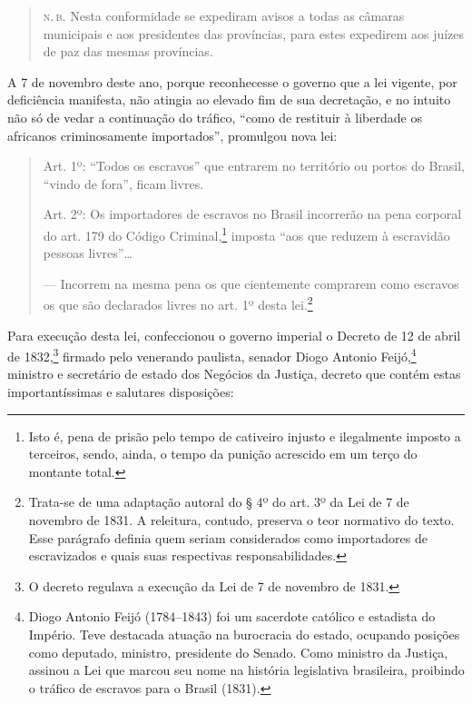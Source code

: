 \begin{quote}
\textsc{n.\,b.} Nesta conformidade se expediram avisos a todas as câmaras
municipais e aos presidentes das províncias, para estes expedirem aos
juízes de paz das mesmas províncias.
\end{quote}

A 7 de novembro deste ano, porque reconhecesse o governo que a lei
vigente, por deficiência manifesta, não atingia ao elevado fim de sua
decretação, e no intuito não só de vedar a continuação do tráfico, ``como
de restituir à liberdade os africanos criminosamente importados'',
promulgou nova lei:

\begin{quote}
Art. 1º: ``Todos os escravos'' que entrarem no território ou portos do
Brasil, ``vindo de fora'', ficam livres.

Art. 2º: Os importadores de escravos no Brasil incorrerão na pena
corporal do art. 179 do Código Criminal,\footnote{Isto é, pena de
  prisão pelo tempo de cativeiro injusto e ilegalmente imposto a
  terceiros, sendo, ainda, o tempo da punição acrescido em um terço do
  montante total.} imposta ``aos que reduzem à escravidão pessoas
livres''\ldots{}

--- Incorrem na mesma pena os que cientemente comprarem como escravos os
que são declarados livres no art. 1º desta lei.\footnote{Trata-se de
  uma adaptação autoral do § 4º do art. 3º da Lei de 7 de novembro de
  1831. A releitura, contudo, preserva o teor normativo do texto. Esse
  parágrafo definia quem seriam considerados como
  importadores de escravizados e quais suas respectivas
  responsabilidades.}
\end{quote}

Para execução desta lei, confeccionou o governo imperial o Decreto de 12
de abril de 1832,\footnote{O decreto regulava a execução da Lei de 7 de
  novembro de 1831.} firmado pelo venerando paulista, senador Diogo
Antonio Feijó,\footnote{Diogo Antonio Feijó
  (1784--1843) foi um sacerdote católico e estadista do Império. Teve
  destacada atuação na burocracia do estado, ocupando posições como
  deputado, ministro, presidente do Senado. Como ministro da Justiça,
  assinou a Lei que marcou seu nome na história legislativa brasileira,
  proibindo o tráfico de escravos para o Brasil (1831).} ministro e secretário de
estado dos Negócios da Justiça, decreto que contém estas
importantíssimas e salutares disposições:

